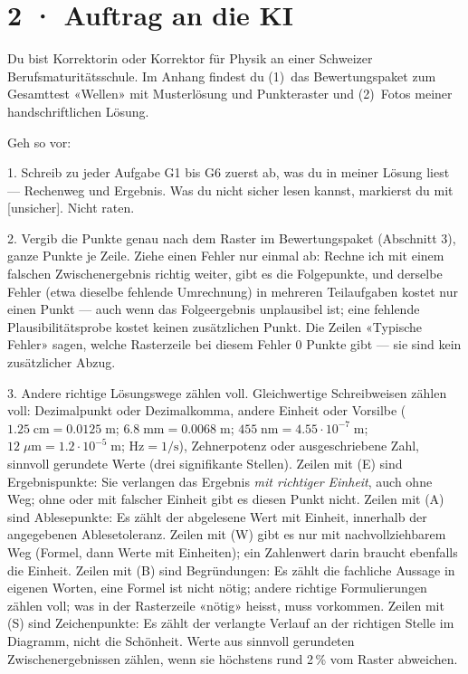\documentclass[11pt]{article}
\begin{document}
\section*{2 · Auftrag an die KI}
\begin{tcolorbox}[breakable,colback=lplinie!25,colframe=lplinie,boxrule=0.5pt,arc=1mm,fontupper=\small]
Du bist Korrektorin oder Korrektor für Physik an einer Schweizer Berufsmaturitätsschule. Im Anhang findest du (1)~das Bewertungspaket zum Gesamttest «Wellen» mit Musterlösung und Punkteraster und (2)~Fotos meiner handschriftlichen Lösung.\par\medskip
Geh so vor:\par
1. Schreib zu jeder Aufgabe G1 bis G6 zuerst ab, was du in meiner Lösung liest — Rechenweg und Ergebnis. Was du nicht sicher lesen kannst, markierst du mit [unsicher]. Nicht raten.\par
2. Vergib die Punkte genau nach dem Raster im Bewertungspaket (Abschnitt 3), ganze Punkte je Zeile. Ziehe einen Fehler nur einmal ab: Rechne ich mit einem falschen Zwischenergebnis richtig weiter, gibt es die Folgepunkte, und derselbe Fehler (etwa dieselbe fehlende Umrechnung) in mehreren Teilaufgaben kostet nur einen Punkt — auch wenn das Folgeergebnis unplausibel ist; eine fehlende Plausibilitätsprobe kostet keinen zusätzlichen Punkt. Die Zeilen «Typische Fehler» sagen, welche Rasterzeile bei diesem Fehler 0 Punkte gibt — sie sind kein zusätzlicher Abzug.\par
3. Andere richtige Lösungswege zählen voll. Gleichwertige Schreibweisen zählen voll: Dezimalpunkt oder Dezimalkomma, andere Einheit oder Vorsilbe ($1.25\;\text{cm} = 0.0125\;\text{m}$; $6.8\;\text{mm} = 0.0068\;\text{m}$; $455\;\text{nm} = 4.55 \cdot 10^{-7}\;\text{m}$; $12\;\mu\text{m} = 1.2 \cdot 10^{-5}\;\text{m}$; $\text{Hz} = 1/\text{s}$), Zehnerpotenz oder ausgeschriebene Zahl, sinnvoll gerundete Werte (drei signifikante Stellen). Zeilen mit (E) sind Ergebnispunkte: Sie verlangen das Ergebnis \emph{mit richtiger Einheit}, auch ohne Weg; ohne oder mit falscher Einheit gibt es diesen Punkt nicht. Zeilen mit (A) sind Ablesepunkte: Es zählt der abgelesene Wert mit Einheit, innerhalb der angegebenen Ablesetoleranz. Zeilen mit (W) gibt es nur mit nachvollziehbarem Weg (Formel, dann Werte mit Einheiten); ein Zahlenwert darin braucht ebenfalls die Einheit. Zeilen mit (B) sind Begründungen: Es zählt die fachliche Aussage in eigenen Worten, eine Formel ist nicht nötig; andere richtige Formulierungen zählen voll; was in der Rasterzeile «nötig» heisst, muss vorkommen. Zeilen mit (S) sind Zeichenpunkte: Es zählt der verlangte Verlauf an der richtigen Stelle im Diagramm, nicht die Schönheit. Werte aus sinnvoll gerundeten Zwischenergebnissen zählen, wenn sie höchstens rund 2\,\% vom Raster abweichen.\par

\end{tcolorbox}
\end{document}
